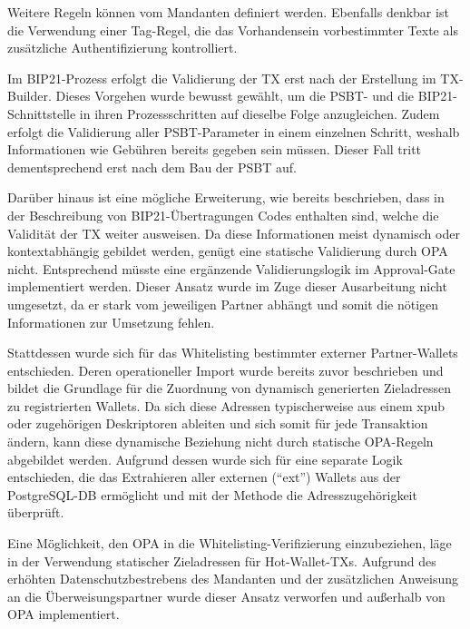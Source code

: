 Weitere Regeln können vom Mandanten definiert werden. Ebenfalls denkbar ist die Verwendung einer Tag-Regel, die das Vorhandensein vorbestimmter Texte als zusätzliche Authentifizierung kontrolliert.

Im \ac{BIP}21-Prozess erfolgt die Validierung der \ac{TX} erst nach der Erstellung im TX-Builder. Dieses Vorgehen wurde bewusst gewählt, um die \ac{PSBT}- und die \ac{BIP}21-Schnittstelle in ihren Prozessschritten auf dieselbe Folge anzugleichen. Zudem erfolgt die Validierung aller \ac{PSBT}-Parameter in einem einzelnen Schritt, weshalb Informationen wie Gebühren bereits gegeben sein müssen. Dieser Fall tritt dementsprechend erst nach dem Bau der \ac{PSBT} auf.

Darüber hinaus ist eine mögliche Erweiterung, wie bereits beschrieben, dass in der Beschreibung von \ac{BIP}21-Übertragungen Codes enthalten sind, welche die Validität der \ac{TX} weiter ausweisen. Da diese Informationen meist dynamisch oder kontextabhängig gebildet werden, genügt eine statische Validierung durch \ac{OPA} nicht. Entsprechend müsste eine ergänzende Validierungslogik im Approval-Gate implementiert werden. Dieser Ansatz wurde im Zuge dieser Ausarbeitung nicht umgesetzt, da er stark vom jeweiligen Partner abhängt und somit die nötigen Informationen zur Umsetzung fehlen.

Stattdessen wurde sich für das Whitelisting bestimmter externer Partner-Wallets entschieden. Deren operationeller Import wurde bereits zuvor beschrieben und bildet die Grundlage für die Zuordnung von dynamisch generierten Zieladressen zu registrierten Wallets.
Da sich diese Adressen typischerweise aus einem \ac{xpub} oder zugehörigen Deskriptoren ableiten und sich somit für jede Transaktion ändern, kann diese dynamische Beziehung nicht durch statische \ac{OPA}-Regeln abgebildet werden.
Aufgrund dessen wurde sich für eine separate Logik entschieden, die das Extrahieren aller externen (\enquote{ext}) Wallets aus der PostgreSQL-\ac{DB} ermöglicht und mit der Methode  die Adresszugehörigkeit überprüft.

Eine Möglichkeit, den \ac{OPA} in die Whitelisting-Verifizierung einzubeziehen, läge in der Verwendung statischer Zieladressen für Hot-Wallet-\acp{TX}. Aufgrund des erhöhten Datenschutzbestrebens des Mandanten und der zusätzlichen Anweisung an die Überweisungspartner wurde dieser Ansatz verworfen und außerhalb von \ac{OPA} implementiert.

